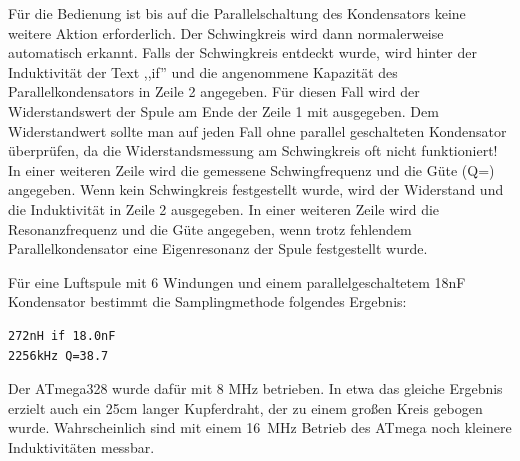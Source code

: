 Für die Bedienung ist bis auf die Parallelschaltung des Kondensators keine weitere
Aktion erforderlich. Der Schwingkreis wird dann normalerweise automatisch erkannt.
Falls der Schwingkreis entdeckt wurde, wird hinter der Induktivität der Text
,,if'' und die angenommene Kapazität des Parallelkondensators in Zeile 2 angegeben.
Für diesen Fall wird der Widerstandswert der Spule am Ende der Zeile 1 mit ausgegeben.
Dem Widerstandwert sollte man auf jeden Fall ohne parallel geschalteten Kondensator überprüfen,
da die Widerstandsmessung am Schwingkreis oft nicht funktioniert!
In einer weiteren Zeile wird die gemessene Schwingfrequenz und die Güte (Q=) angegeben.
Wenn kein Schwingkreis festgestellt wurde, wird der Widerstand und die Induktivität
in Zeile 2 ausgegeben. In einer weiteren Zeile wird die Resonanzfrequenz und die
Güte angegeben, wenn trotz fehlendem Parallelkondensator eine Eigenresonanz der Spule
festgestellt wurde.

Für eine Luftspule mit 6 Windungen und einem parallelgeschaltetem 18nF Kondensator
bestimmt die Samplingmethode folgendes Ergebnis:

\begin{verbatim}
272nH if 18.0nF
2256kHz Q=38.7
\end{verbatim}

Der ATmega328 wurde dafür mit 8 MHz betrieben. In etwa das gleiche Ergebnis erzielt auch
ein 25cm langer Kupferdraht, der zu einem großen Kreis gebogen wurde.
Wahrscheinlich sind mit einem 16~MHz Betrieb des ATmega noch kleinere Induktivitäten messbar.
